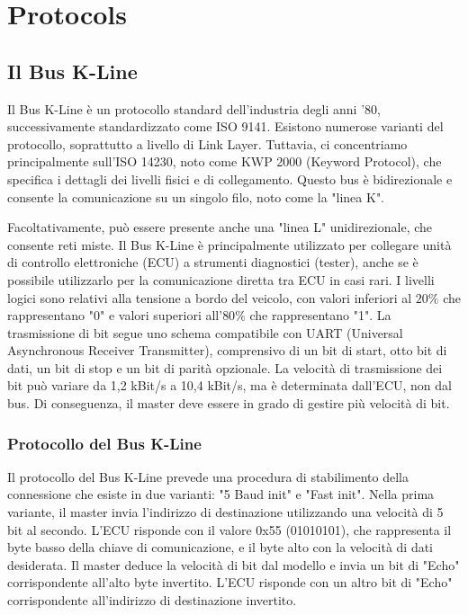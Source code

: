 \section{Protocols}


\subsection{Il Bus K-Line}

Il Bus K-Line è un protocollo standard dell'industria degli anni '80, successivamente standardizzato come ISO 9141. Esistono numerose varianti del protocollo, soprattutto a livello di Link Layer. Tuttavia, ci concentriamo principalmente sull'ISO 14230, noto come KWP 2000 (Keyword Protocol), che specifica i dettagli dei livelli fisici e di collegamento. Questo bus è bidirezionale e consente la comunicazione su un singolo filo, noto come la "linea K".

Facoltativamente, può essere presente anche una "linea L" unidirezionale, che consente reti miste. Il Bus K-Line è principalmente utilizzato per collegare unità di controllo elettroniche (ECU) a strumenti diagnostici (tester), anche se è possibile utilizzarlo per la comunicazione diretta tra ECU in casi rari. I livelli logici sono relativi alla tensione a bordo del veicolo, con valori inferiori al $20\%$ che rappresentano "0" e valori superiori all'$80\%$ che rappresentano "1". La trasmissione di bit segue uno schema compatibile con UART (Universal Asynchronous Receiver Transmitter), comprensivo di un bit di start, otto bit di dati, un bit di stop e un bit di parità opzionale. La velocità di trasmissione dei bit può variare da 1,2 kBit/s a 10,4 kBit/s, ma è determinata dall'ECU, non dal bus. Di conseguenza, il master deve essere in grado di gestire più velocità di bit.

\subsubsection{Protocollo del Bus K-Line}

Il protocollo del Bus K-Line prevede una procedura di stabilimento della connessione che esiste in due varianti: "5 Baud init" e "Fast init". Nella prima variante, il master invia l'indirizzo di destinazione utilizzando una velocità di 5 bit al secondo. L'ECU risponde con il valore 0x55 (01010101), che rappresenta il byte basso della chiave di comunicazione, e il byte alto con la velocità di dati desiderata. Il master deduce la velocità di bit dal modello e invia un bit di "Echo" corrispondente all'alto byte invertito. L'ECU risponde con un altro bit di "Echo" corrispondente all'indirizzo di destinazione invertito.

